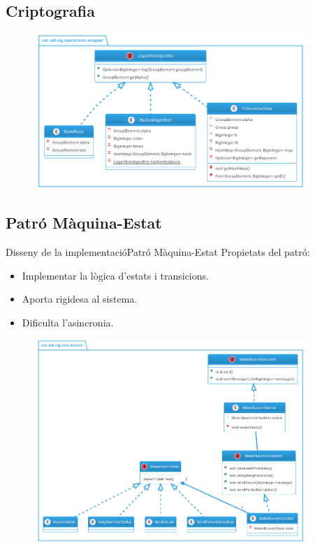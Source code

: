 \documentclass{beamer}
\begin{document}
\subsection{Criptografia}
\begin{frame}
	\begin{figure}
		\includegraphics[width=28em]{images/log}
	\end{figure}
\end{frame}
\subsection{Patró Màquina-Estat}
\begin{frame}{Disseny de la implementació}{Patró Màquina-Estat}
	Propietats del patró:
	\begin{itemize}
		\item Implementar la lògica d'estats i transicions.
		\item Aporta rigidesa al sistema.
		\item Dificulta l'asincronia.
	\end{itemize}
\end{frame}
\begin{frame}
	\begin{figure}
		\includegraphics[width=28em]{images/busomprot}
	\end{figure}
\end{frame}
\end{document}
